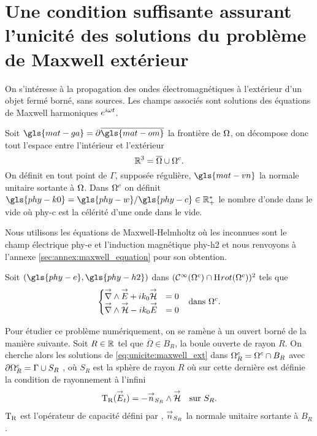 \section[Une CSU des solutions du problème de Maxwell extérieur]{Une condition suffisante assurant l'unicité des solutions du problème de Maxwell extérieur}

  On s’intéresse à la propagation des ondes électromagnétiques à l'extérieur d'un objet fermé borné, sans sources. Les champs associés sont solutions des équations de Maxwell harmoniques \(e^{i\w t}\). 

  Soit \(\gls{mat-ga}=\partial\overline{\gls{mat-om}}\) la frontière de \(\OO\), on décompose donc tout l'espace entre l'intérieur et l'extérieur 
  \[
    \RR^3 = \overline{\OO}\cup{\OO}^c.
  \]
  On définit en tout point de \(\Gamma\), supposée régulière, \(\gls{mat-vn}\) la normale unitaire sortante à \(\OO\).
  Dans \(\OO^c\) on définit \(\gls{phy-k0}=\gls{phy-w} / \gls{phy-c} \in \RR_+^*\) le nombre d'onde dans le vide où \gls{phy-c} est la célérité d'une onde dans le vide.

  Nous utilisons les équations de Maxwell-Helmholtz où les inconnues sont le champ électrique \gls{phy-e} et l'induction magnétique \gls{phy-h2} et nous renvoyons à l'annexe \ref{sec:annex:maxwell_equation} pour son obtention. 

  Soit \((\gls{phy-e},\gls{phy-h2})\) dans \((\mathcal{C}^\infty(\OO^c)\cap\Sobolev[rot](\OO^c))^2\) tels que
  \begin{align}
  \left\lbrace
    \begin{matrix}
      \vrot \vE + i k_0 \vH &= 0
      \\
      \vrot \vH - i k_0 \vE &= 0
    \end{matrix}
    \right. && \text{dans \(\OO^c\).}
    \label{eq:unicite:maxwell_ext}
  \end{align}


  Pour étudier ce problème numériquement, on se ramène à un ouvert borné de la manière suivante. Soit \(R\in\RR\) tel que \(\overline{\Omega}\in B_R\), la boule ouverte de rayon \(R\). On cherche alors les solutions de \eqref{eq:unicite:maxwell_ext} dans \(\OO^c_R=\OO^c\cap B_R\) avec \(\partial\OO^c_R = \Gamma\cup S_R\) , où \(S_R\) est la sphère de rayon \(R\) où sur cette dernière est définie la condition de rayonnement à l'infini
  \begin{equation}
    \label{eq:unicite:TR}
    \begin{aligned}
    \Tr(\vE_t) = - \vn_{S_R} \pvect \vH && \text{sur \(S_R\).}
    \end{aligned}
  \end{equation}
  \(\Tr\) est l'opérateur de capacité défini par \cite[p.~200]{nedelec_acoustic_2001}, \(\vn_{S_R}\) la normale unitaire sortante à \(B_R\).

